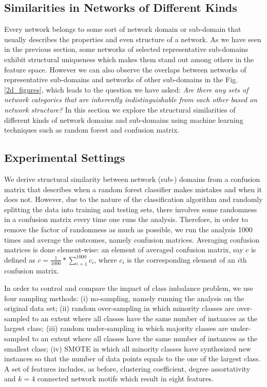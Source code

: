 \subsection*{Similarities in Networks of Different Kinds}
Every network belongs to some sort of network domain or sub-domain that usually describes the properties and even structure of a network. As we have seen in the previous section, some networks of selected representative sub-domains exhibit structural uniqueness which makes them stand out among others in the feature space. However we can also observe the overlaps between networks of representative sub-domains and networks of other sub-domains in the Fig. \ref{2d_figures}, which leads to the question we have asked:  \textit{Are there any sets of network categories that are inherently indistinguishable from each other based on network structure?} In this section we explore the structural similarities of different kinds of network domains and sub-domains using machine learning techniques such as random forest and confusion matrix.  

\subsection*{Experimental Settings}
We derive structural similarity between network (sub-) domains from a confusion matrix that describes when a random forest classifier makes mistakes and when it does not. However, due to the nature of the classification algorithm and randomly splitting the data into training and testing sets, there involves some randomness in a confusion matrix every time one runs the analysis. Therefore, in order to remove the factor of randomness as much as possible, we run the analysis 1000 times and average the outcomes, namely confusion matrices. Averaging confusion matrices is done element-wise: an element of averaged confusion matrix, say $c$ is defined as $c = \frac{1}{1000}*\sum_{i=1}^{1000} c_i$, where $c_i$ is the corresponding element of an $i$th confusion matrix.

In order to control and compare the impact of class imbalance problem, we use four sampling methods: (i) no-sampling, namely running the analysis on the original data set; (ii) random over-sampling in which minority classes are over-sampled to an extent where all classes have the same number of instances as the largest class; (iii) random under-sampling in which majority classes are under-sampled to an extent where all classes have the same number of instances as the smallest class; (iv) SMOTE in which all minority classes have synthesized new instances so that the number of data points equals to the one of the largest class. A set of features includes, as before, clustering coefficient, degree assortativity and $k = 4$ connected network motifs which result in eight features.
 
